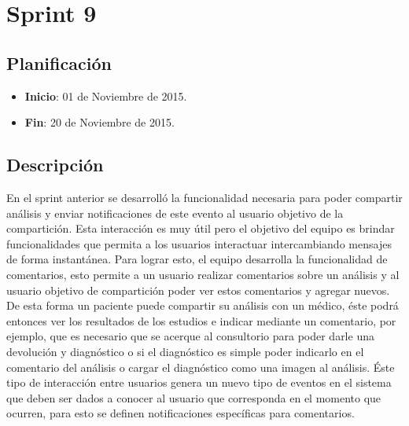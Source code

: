 \section{Sprint 9} %

\subsection{Planificación}
\begin{itemize}
    \item \textbf{Inicio}: 01 de Noviembre de 2015.
    \item \textbf{Fin}: 20 de Noviembre de 2015.
\end{itemize}


\subsection{Descripción}

En el sprint anterior se desarrolló la funcionalidad necesaria para poder compartir análisis y enviar notificaciones de este evento al usuario objetivo de la compartición. Esta interacción es muy útil pero el objetivo del equipo es brindar funcionalidades que permita a los usuarios interactuar intercambiando mensajes de forma instantánea. Para lograr esto, el equipo desarrolla la funcionalidad de comentarios, esto permite a un usuario realizar comentarios sobre un análisis y al usuario objetivo de compartición poder ver estos comentarios y agregar nuevos. De esta forma un paciente puede compartir su análisis con un médico, éste podrá entonces ver los resultados de los estudios e indicar mediante un comentario, por ejemplo, que es necesario que se acerque al consultorio para poder darle una devolución y diagnóstico o si el diagnóstico es simple poder indicarlo en el comentario del análisis o cargar el diagnóstico como una imagen al análisis. Éste tipo de interacción entre usuarios genera un nuevo tipo de eventos en el sistema que deben ser dados a conocer al usuario que corresponda en el momento que ocurren, para esto se definen notificaciones específicas para comentarios.

